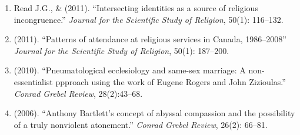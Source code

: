 \begin{enumerate}
\item Read J.G., \& \Eagle \hspace{.01em} (2011). ``Intersecting identities as a source of religious incongruence.''  \emph{Journal for the Scientific Study of Religion}, 50(1): 116--132. 

\item \Eagle \hspace{.01em} (2011). ``Patterns of attendance at religious services in Canada, 1986--2008'' \emph{Journal for the Scientific Study of Religion}, 50(1): 187--200. 

\item \Eagle \hspace{.01em} (2010). ``Pneumatological ecclesiology and same-sex marriage: A non-essentialist ppproach using the work of Eugene Rogers and John Zizioulas.'' \emph{Conrad Grebel Review}, 28(2):43--68.

\item \Eagle\hspace{.01em} (2006). ``Anthony Bartlett's concept of abyssal compassion and the possibility of a truly nonviolent atonement.'' \emph{Conrad Grebel Review}, 26(2): 66--81.	

\end{enumerate}






